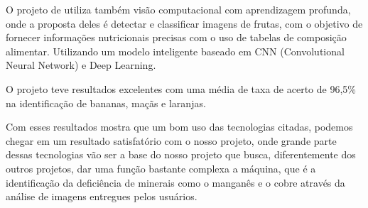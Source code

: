 O projeto de \textcite{EstadoArte3} utiliza também visão computacional com aprendizagem profunda, onde a proposta deles é detectar e classificar imagens de frutas, com o objetivo de fornecer informações nutricionais precisas com o uso de tabelas de composição alimentar. Utilizando um modelo inteligente baseado em CNN (Convolutional Neural Network) e Deep Learning. 

O projeto teve resultados excelentes com uma média de taxa de acerto de 96,5\% na identificação de bananas, maçãs e laranjas.

Com esses resultados mostra que um bom uso das tecnologias citadas, podemos chegar em um resultado satisfatório com o nosso projeto, onde grande parte dessas tecnologias vão ser a base do nosso projeto que busca, diferentemente dos outros projetos, dar uma função bastante complexa a máquina, que é a identificação da deficiência de minerais como o manganês e o cobre através da análise de imagens entregues pelos usuários.
